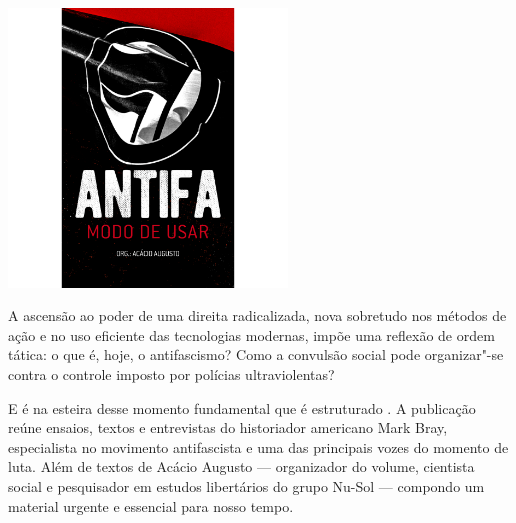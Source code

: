 \begin{center}
\hspace*{-3.6cm}
\hspace*{3.1cm}\includegraphics[width=74mm]{./grid/antifa.png}
\end{center}

\hspace*{-7cm}\hrulefill\hspace*{-7cm}

\medskip

\noindent{}A ascensão ao poder de uma direita radicalizada, nova sobretudo nos métodos de ação e no uso eficiente das tecnologias modernas, impõe uma reflexão de ordem tática: o que é, hoje, o antifascismo? Como a convulsão social pode organizar"-se contra o controle imposto por polícias ultraviolentas?

E é na esteira desse momento fundamental que é estruturado {}. A publicação reúne ensaios, textos e entrevistas do historiador americano Mark Bray, especialista no movimento antifascista e uma das principais vozes do momento de luta. Além de textos de Acácio Augusto --- organizador do volume, cientista social e pesquisador em estudos libertários do grupo Nu-Sol --- compondo um material urgente e essencial para nosso tempo.

\vfill

\hspace*{-.4cm}\begin{minipage}[c]{.5\linewidth}
\small{
{}}
\end{minipage}

